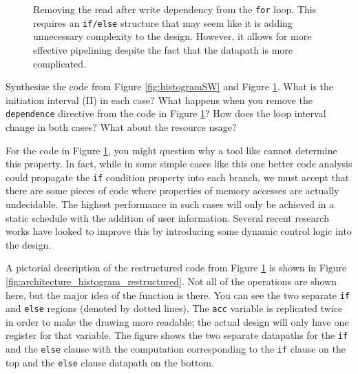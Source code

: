 \begin{figure}
{\footnotesize }
\caption{ Removing the read after write dependency from the \lstinline{for} loop. This requires an \lstinline{if/else} structure that may seem like it is adding unnecessary complexity to the design. However, it allows for more effective pipelining despite the fact that the datapath is more complicated. }
\label{fig:histogramOpt1}
\end{figure}

\begin{exercise}
Synthesize the code from Figure \ref{fig:histogramSW} and Figure \ref{fig:histogramOpt1}. What is the initiation interval (II) in each case? What happens when you remove the \lstinline{dependence} directive from the code in Figure \ref{fig:histogramOpt1}? How does the loop interval change in both cases? What about the resource usage?
\end{exercise}

\begin{aside}
For the code in Figure \ref{fig:histogramOpt1}, you might question why a tool like \VHLS cannot determine this property.  In fact, while in some simple cases like this one better code analysis could propagate the \lstinline|if| condition property into each branch, we must accept that there are some pieces of code where properties of memory accesses are actually undecidable.  The highest performance in such cases will only be achieved in a static schedule with the addition of user information.  Several recent research works have looked to improve this by introducing some dynamic control logic into the design\cite{winterstein13dynamic, liu17elasticflow, dai17dynamic}.
\end{aside}

A pictorial description of the restructured code from Figure \ref{fig:histogramOpt1} is shown in Figure \ref{fig:architecture_histogram_restructured}. Not all of the operations are shown here, but the major idea of the function is there. You can see the two separate \lstinline{if} and \lstinline{else} regions (denoted by dotted lines). The \lstinline{acc} variable is replicated twice in order to make the drawing more readable; the actual design will only have one register for that variable.  The figure shows the two separate datapaths for the \lstinline{if} and the \lstinline{else} clause with the computation corresponding to the \lstinline{if} clause on the top and the \lstinline{else} clause datapath on the bottom. 

